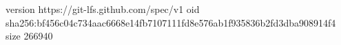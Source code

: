 version https://git-lfs.github.com/spec/v1
oid sha256:bf456c04c734aac6668e14fb7107111fd8e576ab1f935836b2fd3dba908914f4
size 266940
